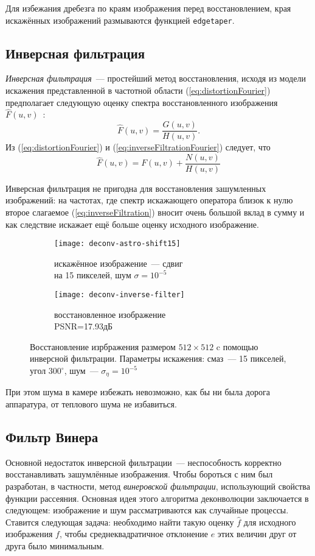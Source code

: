 Для избежания дребезга по краям изображения перед восстановлением, края искажённых изображений размываются функцией \verb|edgetaper|.

\subsection{Инверсная фильтрация}
\textit{Инверсная фильтрация}~--- простейший метод восстановления, исходя из модели искажения представленной в частотной области (\ref{eq:distortionFourier}) предполагает следующую оценку спектра восстановленного изображения $\hat{F}(u,v)$~\cite[стр.~411]{gonsalesDigital2012}:
\begin{equation}\label{eq:inverseFiltrationFourier}
\hat{F}(u,v) = \frac{G(u,v)}{H(u,v)}.
\end{equation}
Из (\ref{eq:distortionFourier}) и (\ref{eq:inverseFiltrationFourier}) следует, что
\begin{equation}\label{eq:inverseFiltration}
\hat{F}(u,v) = F(u,v) + \frac{N(u,v)}{H(u,v)}
\end{equation}

Инверсная фильтрация не пригодна для восстановления зашумленных изображений: на частотах, где спектр искажающего оператора близок к нулю второе слагаемое (\ref{eq:inverseFiltration}) вносит очень большой вклад в сумму и как следствие искажает ещё больше оценку исходного изображение.
\begin{figure}[h!]
	\begin{subfigure}[b]{0.5\textwidth}
		\texttt{[image: deconv-astro-shift15]}
		\caption{искажённое изображение~--- сдвиг \\на 15 пикселей, шум $\sigma=10^{-5}$}
		\label{fig:astroShift15}
	\end{subfigure}%
	\begin{subfigure}[b]{0.5\textwidth}
		\texttt{[image: deconv-inverse-filter]}
		\caption{восстановленное изображение\\ PSNR=17.93дБ}
		\label{fig:astroInverseRestored}
	\end{subfigure}%
	\caption{Восстановление изрбражения размером $512\times 512$ c помощью инверсной фильтрации. Параметры искажения: смаз~--- 15 пикселей, угол $300^\circ$, шум~--- $\sigma_\eta=10^{-5}$}
\end{figure}

При этом шума в камере избежать невозможно, как бы ни была дорога аппаратура, от теплового шума не избавиться.

\subsection{Фильтр Винера}
Основной недостаток инверсной фильтрации~--- неспособность корректно восстанавливать зашумлённые изображения. Чтобы бороться с ним был разработан, в частности, метод \textit{винеровской фильтрации}, использующий свойства функции рассеяния. Основная идея этого алгоритма деконволюции заключается в следующем: изображение и шум рассматриваются как случайные процессы. Ставится следующая задача: необходимо найти такую оценку $\hat{f}$ для исходного изображения $f$, чтобы среднеквадратичное отклонение $e$ этих величин друг от друга было минимальным.

